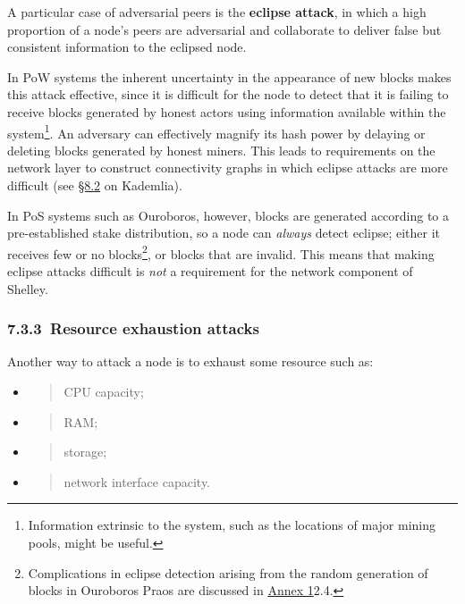 \documentclass[11pt,a4paper]{article}
\begin{document}
A particular case of adversarial peers is the \textbf{eclipse attack},
in which a high proportion of a node's peers are adversarial and
collaborate to deliver false but consistent information to the eclipsed
node.

In PoW systems the inherent uncertainty in the appearance of new blocks
makes this attack effective, since it is difficult for the node to
detect that it is failing to receive blocks generated by honest actors
using information available within the system\footnote{Information
  extrinsic to the system, such as the locations of major mining pools,
  might be useful.}. An adversary can effectively magnify its hash power
by delaying or deleting blocks generated by honest miners. This leads to
requirements on the network layer to construct connectivity graphs in
which eclipse attacks are more difficult (see
\protect\hyperlink{kademlia}{{§8.2}} on Kademlia).

In PoS systems such as Ouroboros, however, blocks are generated
according to a pre-established stake distribution, so a node can
\emph{always} detect eclipse; either it receives few or no
blocks\footnote{Complications in eclipse detection arising from the
  random generation of blocks in Ouroboros Praos are discussed in
  \protect\hyperlink{distribution-of-leadership}{{Annex 1}}2.4.}, or
blocks that are invalid. This means that making eclipse attacks
difficult is \emph{not} a requirement for the network component of
Shelley.

\hypertarget{resource-exhaustion-attacks}{%
\subsubsection{​7.3.3​~Resource exhaustion
attacks}\label{resource-exhaustion-attacks}}

Another way to attack a node is to exhaust some resource such as:

\begin{itemize}
\item
  \begin{quote}
  CPU capacity;
  \end{quote}
\item
  \begin{quote}
  RAM;
  \end{quote}
\item
  \begin{quote}
  storage;
  \end{quote}
\item
  \begin{quote}
  network interface capacity.
  \end{quote}
\end{itemize}
\end{document}
